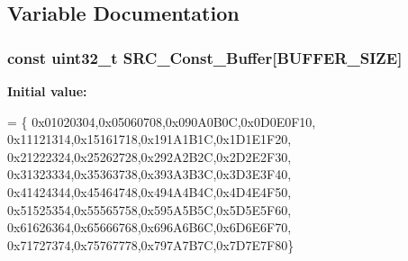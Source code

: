\subsection{Variable Documentation}
\hypertarget{group___d_m_a___f_l_a_s_h___r_a_m_gaa395c8ade60ef51d8127a2393ea5c56c}{
\subsubsection[{S\-R\-C\-\_\-\-Const\-\_\-\-Buffer}]{\setlength{\rightskip}{0pt plus 5cm}const uint32\-\_\-t S\-R\-C\-\_\-\-Const\-\_\-\-Buffer\mbox{[}B\-U\-F\-F\-E\-R\-\_\-\-S\-I\-Z\-E\mbox{]}}}\label{group___d_m_a___f_l_a_s_h___r_a_m_gaa395c8ade60ef51d8127a2393ea5c56c}
{\bfseries Initial value\-:}
\begin{DoxyCode}
= \{
                                    0x01020304,0x05060708,0x090A0B0C,0x0D0E0F10,
                                    0x11121314,0x15161718,0x191A1B1C,0x1D1E1F20,
                                    0x21222324,0x25262728,0x292A2B2C,0x2D2E2F30,
                                    0x31323334,0x35363738,0x393A3B3C,0x3D3E3F40,
                                    0x41424344,0x45464748,0x494A4B4C,0x4D4E4F50,
                                    0x51525354,0x55565758,0x595A5B5C,0x5D5E5F60,
                                    0x61626364,0x65666768,0x696A6B6C,0x6D6E6F70,
                                    0x71727374,0x75767778,0x797A7B7C,0x7D7E7F80\}
\end{DoxyCode}

